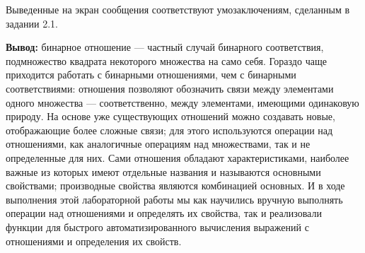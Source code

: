 \documentclass[12pt]{article}
\begin{document}
\begin{figure}[h]
	\noindent{}
	\end{figure}

	\begin{figure}[h]
		\noindent{}
	\end{figure}
		
	Выведенные на экран сообщения соответствуют умозаключениям, сделанным в задании 2.1.
	
	{\bf Вывод:} бинарное отношение --- частный случай бинарного соответствия, подмножество квадрата некоторого множества на само себя. Гораздо чаще приходится работать с бинарными отношениями, чем с бинарными соответствиями: отношения позволяют обозначить связи между элементами одного множества --- соответственно, между элементами, имеющими одинаковую природу. На основе уже существующих отношений можно создавать новые, отображающие более сложные связи; для этого используются операции над отношениями, как аналогичные операциям над множествами, так и не определенные для них. Сами отношения обладают характеристиками, наиболее важные из которых имеют отдельные названия и называются основными свойствами; производные свойства являются комбинацией основных. И в ходе выполнения этой лабораторной работы мы как научились вручную выполнять операции над отношениями и определять их свойства, так и реализовали функции для быстрого автоматизированного вычисления выражений с отношениями и определения их свойств.
	
\end{document}
